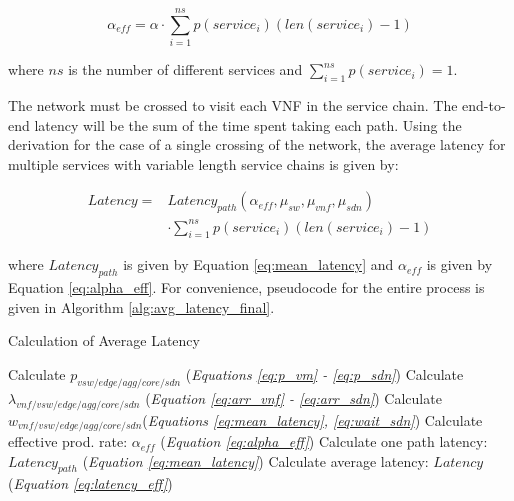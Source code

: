 \begin{equation}
\label{eq:alpha_eff}
\alpha_{eff} = \alpha \cdot \sum_{i=1}^{ns} p(service_i) (len(service_i) - 1)
\end{equation}

\noindent where $ns$ is the number of different services and $\sum_{i=1}^{ns} p(service_i) = 1$.

The network must be crossed to visit each VNF in the service chain. The end-to-end latency will be the sum of the time spent taking each path. Using the derivation for the case of a single crossing of the network, the average latency for multiple services with variable length service chains is given by:

\begin{equation}
\label{eq:latency_eff}
\begin{split}
Latency = & Latency_{path}(\alpha_{eff}, \mu_{sw}, \mu_{vnf}, \mu_{sdn}) \\
			  &\cdot \sum_{i=1}^{ns} p(service_i) (len(service_i) - 1)
\end{split}
\end{equation}

\noindent where $Latency_{path}$ is given by Equation \ref{eq:mean_latency} and $\alpha_{eff}$ is given by Equation \ref{eq:alpha_eff}. For convenience, pseudocode for the entire process is given in Algorithm \ref{alg:avg_latency_final}.

\begin{algorithm}

\caption{Calculation of Average Latency}
\label{alg:avg_latency_final}

\begin{algorithmic}[1]
\STATE Calculate $p_{vsw/edge/agg/core/sdn}$ \hfill(\textit{Equations \ref{eq:p_vm} - \ref{eq:p_sdn}})
\STATE Calculate $\lambda_{vnf/vsw/edge/agg/core/sdn}$ \hfill(\textit{Equation \ref{eq:arr_vnf} - \ref{eq:arr_sdn}})
\STATE Calculate $w_{vnf/vsw/edge/agg/core/sdn}$\hfill(\textit{Equations \ref{eq:mean_latency}, \ref{eq:wait_sdn}})
\STATE Calculate effective prod. rate: $\alpha_{eff}$ \hfill(\textit{Equation \ref{eq:alpha_eff}})
\STATE Calculate one path latency: $Latency_{path}$ \hfill (\textit{Equation \ref{eq:mean_latency}})
\STATE Calculate average latency: $Latency$ \hfill (\textit{Equation \ref{eq:latency_eff}})
\end{algorithmic}
\end{algorithm}